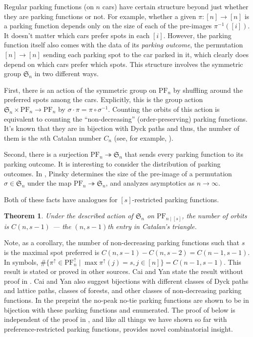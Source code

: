 \documentclass[12 pt]{amsart}
\newtheorem{theorem}{Theorem}
\theoremstyle{definition} %
\theoremstyle{remark} %
\begin{document}
Regular parking functions (on $n$ cars) have certain structure beyond just whether they are parking functions or not. For example, whether a given $\pi : [n] \to [n]$ is a parking function depends only on the size of each of the pre-images $\pi^{-1}([i])$. It doesn't matter which cars prefer spots in each $[i]$. However, the parking function itself also comes with the data of its \emph{parking outcome}, the permutation $[n] \to [n]$ sending each parking spot to the car parked in it, which clearly does depend on which cars prefer which spots. This structure involves the symmetric group $\mathfrak{S}_{n}$ in two different ways.

First, there is an action of the symmetric group on $\mathrm{PF}_{n}$ by shuffling around the preferred spots among the cars. Explicitly, this is the group action $\mathfrak{S}_{n} \times \mathrm{PF}_{n} \to \mathrm{PF}_{n}$ by $\sigma \cdot \pi = \pi \circ \sigma^{-1}$. Counting the orbits of this action is equivalent to counting the ``non-decreasing'' (order-preserving) parking functions. It's known that they are in bijection with Dyck paths and thus, the number of them is the $n$th Catalan number $C_{n}$ (see, for example, \cite{armstrong-loehr-warrington-2016}).

Second, there is a surjection $\mathrm{PF}_{n} \twoheadrightarrow \mathfrak{S}_{n}$ that sends every parking function to its parking outcome. It is interesting to consider the distribution of parking outcomes. In \cite{pinsky-2024}, Pinsky determines the size of the pre-image of a permutation $\sigma \in \mathfrak{S}_{n}$ under the map $\mathrm{PF}_{n} \twoheadrightarrow \mathfrak{S}_{n}$, and analyzes asymptotics as $n \to \infty$.

Both of these facts have analogues for $[s]$-restricted parking functions. 

\begin{theorem}
	Under the described action of $\mathfrak{S}_{n}$ on $\mathrm{PF}_{n \mid [s]}$, the number of orbits is $C(n, s - 1)$ --- the $(n, s - 1)$th entry in Catalan's triangle. \cite[A009766]{oeis}
\end{theorem} 

Note, as a corollary, the number of non-decreasing parking functions such that $s$ is the maximal spot preferred is $C(n, s - 1) - C(n, s - 2) = C(n - 1, s - 1)$. In symbols, $\# \{ \pi^{\uparrow} \in \mathrm{PF}^{\uparrow}_{n} \mid \max \pi^{\uparrow}(j) = s, j \in [n] \} = C(n - 1, s - 1)$. This result is stated or proved in other sources. Cai and Yan state the result without proof in \cite{cai-yan-2019}. Cai and Yan also suggest bijections with different classes of Dyck paths and lattice paths, classes of forests, and other classes of non-decreasing parking functions. In the preprint \cite{cruz-harris-et-al-2024} the no-peak no-tie parking functions are shown to be in bijection with these parking functions and enumerated. The proof of below is independent of the proof in \cite{cruz-harris-et-al-2024}, and like all things we have shown so far with preference-restricted parking functions, provides novel combinatorial insight.
\end{document}

